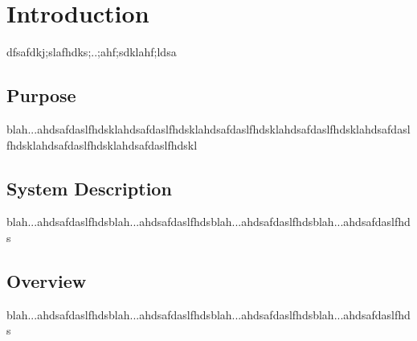 \section{Introduction}
\label{sec:introduction}
dfsafdkj;slafhdks;..;ahf;sdklahf;ldsa

\subsection{Purpose}
\label{sub:purpose}
blah...ahdsafdaslfhdsklahdsafdaslfhdsklahdsafdaslfhdsklahdsafdaslfhdsklahdsafdaslfhdsklahdsafdaslfhdsklahdsafdaslfhdskl


\subsection{System Description}
\label{sub:system_description}
blah...ahdsafdaslfhdsblah...ahdsafdaslfhdsblah...ahdsafdaslfhdsblah...ahdsafdaslfhds


\subsection{Overview}
\label{sub:overview}
blah...ahdsafdaslfhdsblah...ahdsafdaslfhdsblah...ahdsafdaslfhdsblah...ahdsafdaslfhds


